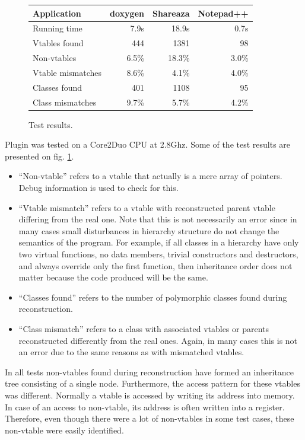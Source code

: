 \documentclass[10pt, conference]{IEEEtran}
\newcommand{\compact}{}
\begin{document}
\begin{figure}[htb!]
\begin{tabular}{| l | r | r | r |}
\hline
Application &         doxygen & Shareaza & Notepad++ \\
\hline
Running time &          7.9s  &   18.9s  & 0.7s \\
\hline
Vtables found &         444   &   1381   &  98 \\
\hline
Non-vtables &           6.5\% &   18.3\% & 3.0\% \\ %
\hline
Vtable mismatches &     8.6\% &    4.1\% & 4.0\% \\
\hline
Classes found &         401   &   1108   &  95 \\
\hline
Class mismatches &      9.7\% &    5.7\% & 4.2\% \\
\hline
\end{tabular}
\caption{Test results.}
\label{fig:tests}
\end{figure}

Plugin was tested on a Core2Duo CPU at 2.8Ghz.
Some of the test results are presented on fig. \ref{fig:tests}. 
\begin{itemize}\compact
\item ``Non-vtable'' refers to a vtable that actually is a mere array of pointers.
    Debug information is used to check for this.
\item ``Vtable mismatch'' refers to a vtable with reconstructed parent vtable differing
    from the real one.
    Note that this is not necessarily an error since in many cases small disturbances
    in hierarchy structure do not change the semantics of the program. For example, if all
    classes in a hierarchy have only two virtual functions, no data members, trivial
    constructors and destructors, and always override only the first function,
    then inheritance order does not matter because the code produced
    will be the same.
\item ``Classes found'' refers to the number of polymorphic classes found
    during reconstruction.
\item ``Class mismatch'' refers to a class with associated vtables or parents
    reconstructed differently from the real ones. Again, in many cases this
    is not an error due to the same reasons as with mismatched vtables.
\end{itemize}

In all tests non-vtables found during reconstruction have formed an inheritance
tree consisting of a single node. 
Furthermore, the access pattern for these vtables was different. 
Normally a vtable is accessed by writing its address into memory. 
In case of an access to non-vtable, its address is often written into a register.
Therefore, even though there were a lot of non-vtables in some test cases, 
these non-vtable were easily identified.
\end{document}
